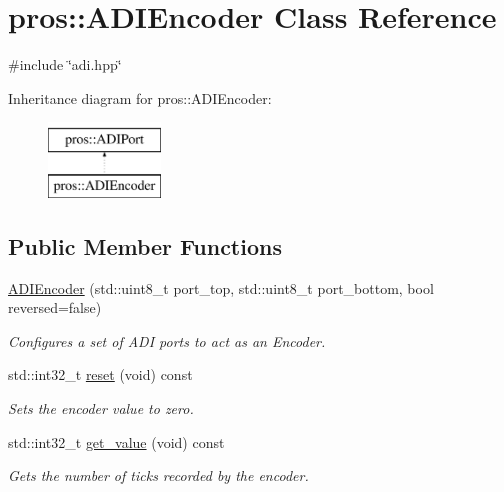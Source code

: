 \hypertarget{classpros_1_1ADIEncoder}{}\section{pros\+:\+:A\+D\+I\+Encoder Class Reference}
\label{classpros_1_1ADIEncoder}


{\ttfamily \#include \char`\"{}adi.\+hpp\char`\"{}}

Inheritance diagram for pros\+:\+:A\+D\+I\+Encoder\+:\begin{figure}[H]
\begin{center}
\leavevmode
\includegraphics[height=2.000000cm]{classpros_1_1ADIEncoder}
\end{center}
\end{figure}
\subsection*{Public Member Functions}
\begin{DoxyCompactItemize}
\item 
\hyperlink{classpros_1_1ADIEncoder_a927287940aedad3ea67f292908c623f7}{A\+D\+I\+Encoder} (std\+::uint8\+\_\+t port\+\_\+top, std\+::uint8\+\_\+t port\+\_\+bottom, bool reversed=false)
\begin{DoxyCompactList}\small\item\em Configures a set of A\+DI ports to act as an Encoder. \end{DoxyCompactList}\item 
std\+::int32\+\_\+t \hyperlink{classpros_1_1ADIEncoder_a38a555946a841150b203f940b4b44cc8}{reset} (void) const
\begin{DoxyCompactList}\small\item\em Sets the encoder value to zero. \end{DoxyCompactList}\item 
std\+::int32\+\_\+t \hyperlink{classpros_1_1ADIEncoder_acb4c087c7318028db25ae39dabb64700}{get\+\_\+value} (void) const
\begin{DoxyCompactList}\small\item\em Gets the number of ticks recorded by the encoder. \end{DoxyCompactList}\end{DoxyCompactItemize}


